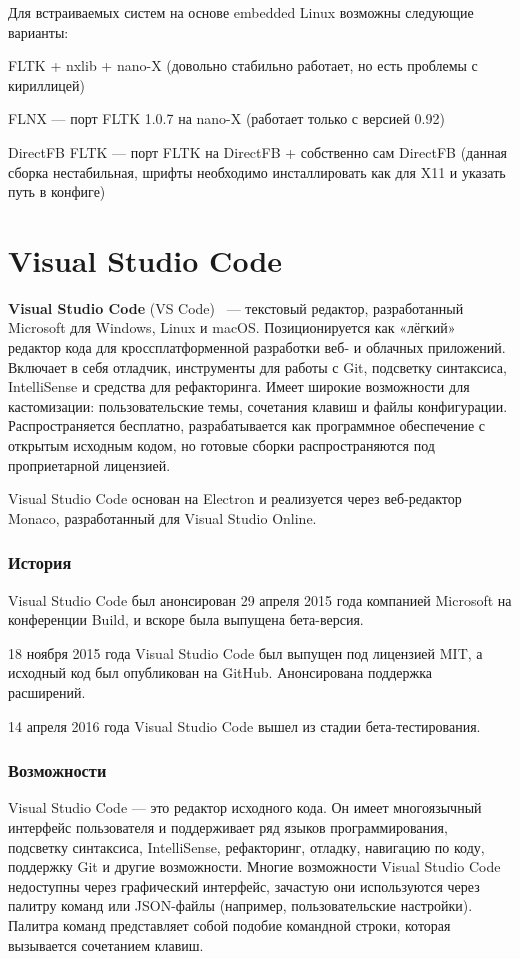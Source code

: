 Для встраиваемых систем на основе embedded Linux возможны следующие варианты:

FLTK + nxlib + nano-X (довольно стабильно работает, но есть проблемы с кириллицей)

FLNX — порт FLTK 1.0.7 на nano-X (работает только с версией 0.92)

DirectFB FLTK — порт FLTK на DirectFB + собственно сам DirectFB (данная сборка нестабильная, шрифты необходимо инсталлировать как для X11 и указать путь в конфиге)

\section{Visual Studio Code}
\textbf{Visual Studio Code} (VS Code)~\cite{wikiVS} — текстовый редактор, разработанный Microsoft для Windows, Linux и macOS. Позиционируется как «лёгкий» редактор кода для кроссплатформенной разработки веб- и облачных приложений. Включает в себя отладчик, инструменты для работы с Git, подсветку синтаксиса, IntelliSense и средства для рефакторинга. Имеет широкие возможности для кастомизации: пользовательские темы, сочетания клавиш и файлы конфигурации. Распространяется бесплатно, разрабатывается как программное обеспечение с открытым исходным кодом, но готовые сборки распространяются под проприетарной лицензией.

Visual Studio Code основан на Electron и реализуется через веб-редактор Monaco, разработанный для Visual Studio Online.
\subsubsection{История}
Visual Studio Code был анонсирован 29 апреля 2015 года компанией Microsoft на конференции Build, и вскоре была выпущена бета-версия.

18 ноября 2015 года Visual Studio Code был выпущен под лицензией MIT, а исходный код был опубликован на GitHub. Анонсирована поддержка расширений.

14 апреля 2016 года Visual Studio Code вышел из стадии бета-тестирования.
\subsubsection{Возможности}
Visual Studio Code — это редактор исходного кода. Он имеет многоязычный интерфейс пользователя и поддерживает ряд языков программирования, подсветку синтаксиса, IntelliSense, рефакторинг, отладку, навигацию по коду, поддержку Git и другие возможности. Многие возможности Visual Studio Code недоступны через графический интерфейс, зачастую они используются через палитру команд или JSON-файлы (например, пользовательские настройки). Палитра команд представляет собой подобие командной строки, которая вызывается сочетанием клавиш.

